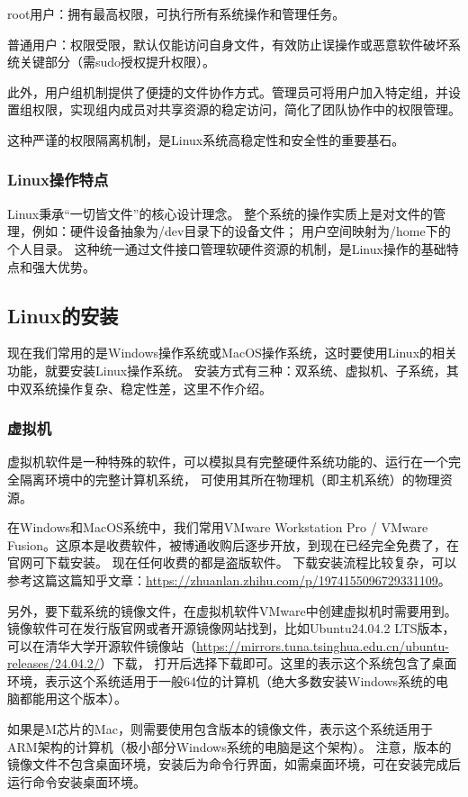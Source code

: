 root用户：拥有最高权限，可执行所有系统操作和管理任务。

普通用户：权限受限，默认仅能访问自身文件，有效防止误操作或恶意软件破坏系统关键部分（需sudo授权提升权限）。

此外，用户组机制提供了便捷的文件协作方式。管理员可将用户加入特定组，并设置组权限，实现组内成员对共享资源的稳定访问，简化了团队协作中的权限管理。

这种严谨的权限隔离机制，是Linux系统高稳定性和安全性的重要基石。

\subsubsection{Linux操作特点}
Linux秉承“一切皆文件”的核心设计理念。
整个系统的操作实质上是对文件的管理，例如：硬件设备抽象为/dev目录下的设备文件；
用户空间映射为/home下的个人目录。
这种统一通过文件接口管理软硬件资源的机制，是Linux操作的基础特点和强大优势。

\subsection{Linux的安装}
现在我们常用的是Windows操作系统或MacOS操作系统，这时要使用Linux的相关功能，就要安装Linux操作系统。
安装方式有三种：双系统、虚拟机、子系统，其中双系统操作复杂、稳定性差，这里不作介绍。
\subsubsection{虚拟机}
虚拟机软件是一种特殊的软件，可以模拟具有完整硬件系统功能的、运行在一个完全隔离环境中的完整计算机系统，
可使用其所在物理机（即主机系统）的物理资源。

在Windows和MacOS系统中，我们常用VMware Workstation Pro / VMware Fusion。这原本是收费软件，被博通收购后逐步开放，到现在已经完全免费了，在官网可下载安装。
现在任何收费的都是盗版软件。
下载安装流程比较复杂，可以参考这篇这篇知乎文章：\url{https://zhuanlan.zhihu.com/p/1974155096729331109}。

另外，要下载系统的镜像文件，在虚拟机软件VMware中创建虚拟机时需要用到。镜像软件可在发行版官网或者开源镜像网站找到，比如Ubuntu24.04.2 LTS版本，
可以在清华大学开源软件镜像站（\url{https://mirrors.tuna.tsinghua.edu.cn/ubuntu-releases/24.04.2/}）下载，
打开后选择下载即可。这里的表示这个系统包含了桌面环境，表示这个系统适用于一般64位的计算机（绝大多数安装Windows系统的电脑都能用这个版本）。

如果是M芯片的Mac，则需要使用包含版本的镜像文件，表示这个系统适用于ARM架构的计算机（极小部分Windows系统的电脑是这个架构）。
注意，版本的镜像文件不包含桌面环境，安装后为命令行界面，如需桌面环境，可在安装完成后运行命令安装桌面环境。



